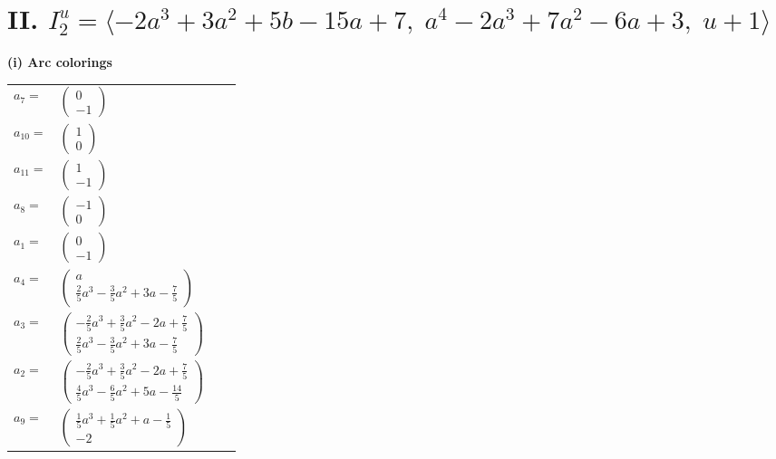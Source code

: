 \documentclass[1p]{elsarticle_modified}
\theoremstyle{definition}
\begin{document}
\centering \section*{II. $I^u_{2}= \langle -2 a^3+3 a^2+5 b-15 a+7,\;a^4-2 a^3+7 a^2-6 a+3,\;u+1 \rangle$}
\flushleft \textbf{(i) Arc colorings}\\
\begin{tabular}{m{7pt} m{180pt} m{7pt} m{180pt} }
\flushright $a_{7}=$&$\begin{pmatrix}0\\-1\end{pmatrix}$ \\
\flushright $a_{10}=$&$\begin{pmatrix}1\\0\end{pmatrix}$ \\
\flushright $a_{11}=$&$\begin{pmatrix}1\\-1\end{pmatrix}$ \\
\flushright $a_{8}=$&$\begin{pmatrix}-1\\0\end{pmatrix}$ \\
\flushright $a_{1}=$&$\begin{pmatrix}0\\-1\end{pmatrix}$ \\
\flushright $a_{4}=$&$\begin{pmatrix}a\\\frac{2}{5} a^3-\frac{3}{5} a^2+3 a-\frac{7}{5}\end{pmatrix}$ \\
\flushright $a_{3}=$&$\begin{pmatrix}-\frac{2}{5} a^3+\frac{3}{5} a^2-2 a+\frac{7}{5}\\\frac{2}{5} a^3-\frac{3}{5} a^2+3 a-\frac{7}{5}\end{pmatrix}$ \\
\flushright $a_{2}=$&$\begin{pmatrix}-\frac{2}{5} a^3+\frac{3}{5} a^2-2 a+\frac{7}{5}\\\frac{4}{5} a^3-\frac{6}{5} a^2+5 a-\frac{14}{5}\end{pmatrix}$ \\
\flushright $a_{9}=$&$\begin{pmatrix}\frac{1}{5} a^3+\frac{1}{5} a^2+a-\frac{1}{5}\\-2\end{pmatrix}$ \\

\end{tabular}
\end{document}

